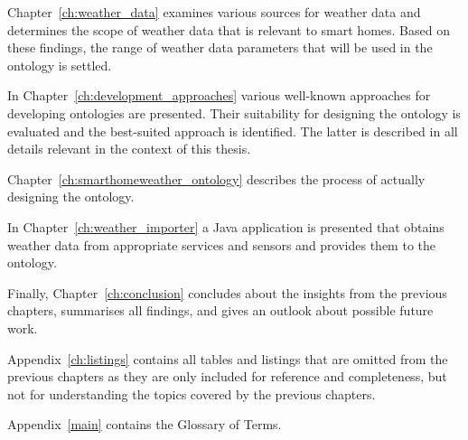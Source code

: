 Chapter~\ref{ch:weather_data} examines various sources for weather data and determines the scope of weather data that is relevant to smart homes. Based on these findings, the range of weather data parameters that will be used in the ontology is settled.

In Chapter~\ref{ch:development_approaches} various well-known approaches for developing ontologies are presented. Their suitability for designing the \smarthomeweather ontology is evaluated and the best-suited approach is identified. The latter is described in all details relevant in the context of this thesis.

Chapter~\ref{ch:smarthomeweather_ontology} describes the process of actually designing the \smarthomeweather ontology.

In Chapter~\ref{ch:weather_importer} a Java application is presented that obtains weather data from appropriate services and sensors and provides them to the \smarthomeweather ontology.

Finally, Chapter~\ref{ch:conclusion} concludes about the insights from the previous chapters, summarises all findings, and gives an outlook about possible future work.

Appendix~\ref{ch:listings} contains all tables and listings that are omitted from the previous chapters as they are only included for reference and completeness, but not for understanding the topics covered by the previous chapters.

Appendix~\ref{main} contains the Glossary of Terms.
